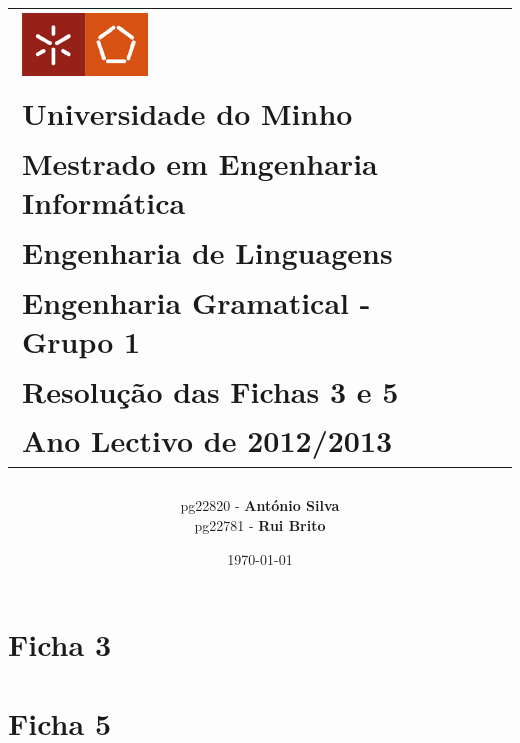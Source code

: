 \documentclass[a4paper,11pt,openright,openbib]{article}
\title{
\begin{center}
	\begin{tabular}{l c r}
	\large{\includegraphics[width=0.3\textwidth]{UM}}&\\
	\large{Universidade do Minho} &\\
	\large{Mestrado em Engenharia Informática} & \\
	\large{Engenharia de Linguagens} & \\
	\large{Engenharia Gramatical - Grupo 1} & \\	
	\large{\textbf{Resolução das Fichas 3 e 5}} & \\
	\large{Ano Lectivo de 2012/2013} & \\
	\end{tabular}
	\end{center}
}
\author{	
	\begin{tabular}[t]{l c r}      
        pg22820 - \textbf{António Silva} \\        
		pg22781 - \textbf{Rui Brito} \\   				
	\\ 
	\end{tabular}
}
\date{\today}
\begin{document}
\maketitle


\pagestyle{headings}
\newpage
\tableofcontents
\newpage

\section{Ficha 3} %
\label{sec:ficha_3}




\section{Ficha 5} %
\label{sec:ficha_5}

\end{document}
